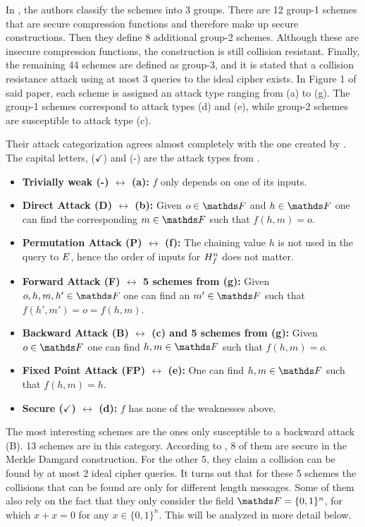 In \cite{C:BlaRogShr02}, the authors classify the schemes into 3 groups.
There are 12 group-1 schemes that are secure compression functions and therefore make up secure \MD constructions.
Then they define 8 additional group-2 schemes.
Although these are insecure compression functions,
the \MD construction is still collision resistant. 
Finally, the remaining 44 schemes are defined as group-3,
and it is stated that a collision resistance attack using at most 3 queries to the ideal cipher exists.
In Figure 1 of said paper, each scheme is assigned an attack type ranging from (a) to (g).
The group-1 schemes correspond to attack types (d) and (e), while group-2 schemes are susceptible to attack type (c).

Their attack categorization agrees almost completely with the one created by \cite{C:PreGovVan93}.
The capital letters, ($\checkmark$) and (-) are the attack types from \cite{C:PreGovVan93}.
\begin{itemize}
\item \textbf{Trivially weak (-) $\leftrightarrow$ (a):} $f$ only depends on one of its inputs.
\item \textbf{Direct Attack (D) $\leftrightarrow$ (b):} Given $o \in \F$ and $h \in \F$ one can find the corresponding $m \in \F$ such that $f(h,m) = o$.
\item \textbf{Permutation Attack (P) $\leftrightarrow$ (f):} The chaining value $h$ is not used in the query to $E$,
        hence the order of inputs for $H^n_f$ does not matter.
\item \textbf{Forward Attack (F) $\leftrightarrow$ 5 schemes from (g):} Given $o, h, m, h' \in \F$ one can find an $m' \in \F$ such that $f(h',m') = o = f(h, m)$.
\item \textbf{Backward Attack (B) $\leftrightarrow$ (c) and 5 schemes from (g):} Given $o \in \F$ one can find $h,m \in \F$ such that $f(h,m) = o$.
\item \textbf{Fixed Point Attack (FP) $\leftrightarrow$ (e):} One can find $h,m \in \F$ such that $f(h,m) = h$.
\item \textbf{Secure ($\checkmark$) $\leftrightarrow$ (d):} $f$ has none of the weaknesses above.
\end{itemize}
The most interesting schemes are the ones only susceptible to a backward attack (B).
13 schemes are in this category.
According to \cite{C:BlaRogShr02}, 8 of them are secure in the Merkle Damgard construction.
For the other 5, they claim a collision can be found by at most 2 ideal cipher queries.
It turns out that for these 5 schemes the collisions that can be found are only for different length messages.
Some of them also rely on the fact that they only consider the field $\F = \{0,1\}^n$, for which $x + x = 0$ for any $x \in \{0,1\}^n$.
This will be analyzed in more detail below.

